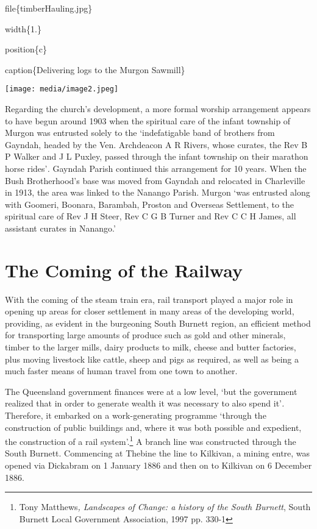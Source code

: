 file\{timberHauling.jpg\}

width\{1.\}

position\{c\}

caption\{Delivering logs to the Murgon Sawmill\}

\texttt{[image: media/image2.jpeg]}

Regarding the church's development, a more formal worship arrangement appears to have begun around 1903 when the spiritual care of the infant township of Murgon was entrusted solely to the `indefatigable band of brothers from Gayndah, headed by the Ven. Archdeacon A R Rivers, whose curates, the Rev B P Walker and J L Puxley, passed through the infant township on their marathon horse rides'\emph{.} Gayndah Parish continued this arrangement for 10 years. When the Bush Brotherhood's base was moved from Gayndah and relocated in Charleville in 1913, the area was linked to the Nanango Parish. Murgon `was entrusted along with Goomeri, Boonara, Barambah, Proston and Overseas Settlement, to the spiritual care of Rev J H Steer, Rev C G B Turner and Rev C C H James, all assistant curates in Nanango.'

\hypertarget{the-coming-of-the-railway}{%
\section{The Coming of the Railway}\label{the-coming-of-the-railway}}

With the coming of the steam train era, rail transport played a major role in opening up areas for closer settlement in many areas of the developing world, providing, as evident in the burgeoning South Burnett region, an efficient method for transporting large amounts of produce such as gold and other minerals, timber to the larger mills, dairy products to milk, cheese and butter factories, plus moving livestock like cattle, sheep and pigs as required, as well as being a much faster means of human travel from one town to another.

The Queensland government finances were at a low level, `but the government realized that in order to generate wealth it was necessary to also spend it'\emph{.} Therefore, it embarked on a work-generating programme `through the construction of public buildings and, where it was both possible and expedient, the construction of a rail system'.\footnote{Tony Matthews\emph{, Landscapes of Change: a history of the South Burnett}, South Burnett Local Government Association, 1997 pp. 330-1} A branch line was constructed through the South Burnett. Commencing at Thebine the line to Kilkivan, a mining entre, was opened via Dickabram on 1 January 1886 and then on to Kilkivan on 6 December 1886.

